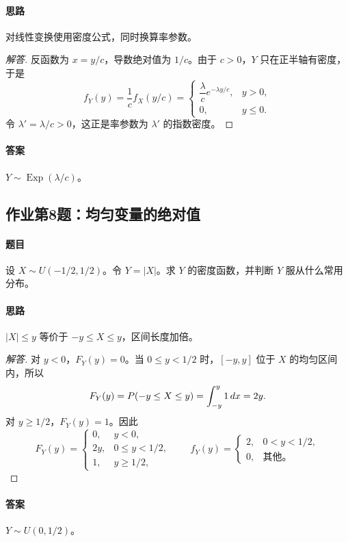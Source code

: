 \paragraph{思路} 对线性变换使用密度公式，同时换算率参数。
\begin{proof}[解答]
反函数为 $x=y/c$，导数绝对值为 $1/c$。由于 $c>0$，$Y$ 只在正半轴有密度，于是
\[
f_Y(y)=\frac1c f_X(y/c)
=\begin{cases}\dfrac\lambda c e^{-\lambda y/c},&y>0,\\0,&y\leq0.\end{cases}
\]
令 $\lambda'=\lambda/c>0$，这正是率参数为 $\lambda'$ 的指数密度。
\end{proof}
\paragraph{答案} $Y\sim\operatorname{Exp}(\lambda/c)$。

\subsection{作业第8题：均匀变量的绝对值}\label{ex:w09-h8}
\paragraph{题目}
设 $X\sim U(-1/2,1/2)$。令 $Y=|X|$。求 $Y$ 的密度函数，并判断 $Y$ 服从什么常用分布。
\paragraph{思路} $|X|\leq y$ 等价于 $-y\leq X\leq y$，区间长度加倍。
\begin{proof}[解答]
对 $y<0$，$F_Y(y)=0$。当 $0\leq y<1/2$ 时，$[-y,y]$ 位于 $X$ 的均匀区间内，所以
\[
F_Y(y)=\P(-y\leq X\leq y)=\int_{-y}^y1\,dx=2y.
\]
对 $y\geq1/2$，$F_Y(y)=1$。因此
\[
F_Y(y)=\begin{cases}0,&y<0,\\2y,&0\leq y<1/2,\\1,&y\geq1/2,\end{cases}
\qquad
f_Y(y)=\begin{cases}2,&0<y<1/2,\\0,&\text{其他。}\end{cases}
\]
\end{proof}
\paragraph{答案} $Y\sim U(0,1/2)$。

